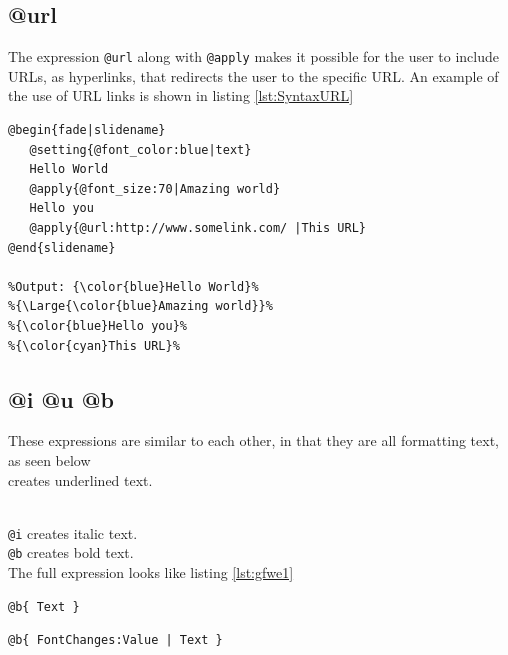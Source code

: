 {{\subsection{@url}
The expression \lstinline!@url! along with \lstinline!@apply! makes it possible for the user to include URLs, as hyperlinks, that redirects the user to the specific URL.
An example of the use of URL links is shown in listing \ref{lst:SyntaxURL}

\begin{lstlisting}[frame=single, caption=Hello World with an URL, label=lst:SyntaxURL]
@begin{fade|slidename}
   @setting{@font_color:blue|text}
   Hello World
   @apply{@font_size:70|Amazing world}
   Hello you
   @apply{@url:http://www.somelink.com/ |This URL}
@end{slidename}

%Output: {\color{blue}Hello World}%
%{\Large{\color{blue}Amazing world}}%
%{\color{blue}Hello you}%
%{\color{cyan}This URL}%
\end{lstlisting}

\subsection{@i @u @b}
These expressions are similar to each other, in that they are all formatting text, as seen below \\

 creates underlined text.} \\
\lstinline!@i! creates italic text. \\
\lstinline!@b! creates bold text. \\
The full expression looks like listing \ref{lst:gfwe1}
\newpage
\begin{lstlisting}[frame=single, caption=Generic \texttt{font weight} expression example, label=lst:gfwe1]
@b{ Text }
\end{lstlisting}


\begin{lstlisting}[frame=single, caption=Generic \texttt{font weight} expression example, label=lst:gfwe2]
@b{ FontChanges:Value | Text }
\end{lstlisting}

}
